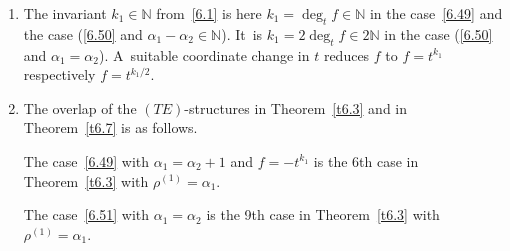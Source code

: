 \documentclass[10pt,a4paper]{amsart}
\numberwithin{equation}{section}
\numberwithin{figure}{section}
\newcommand{\N}{{\mathbb N}}
\begin{document}
\begin{Remarks}
\begin{enumerate}
\item[$(v)$] The invariant $k_1\in\N$ from~\eqref{6.1} is here
$k_1=\deg_t f\in\N$ in the case~\eqref{6.49}
and the case (\eqref{6.50} and $\alpha_1-\alpha_2\in\N$). It~is $k_1=2\deg_t f\in 2\N$ in the case
(\eqref{6.50} and $\alpha_1=\alpha_2$).
A~suitable coordinate change in $t$
reduces $f$ to $f=t^{k_1}$ respectively $f=t^{k_1/2}$.

\item[$(vi)$] The overlap of the $(TE)$-structures in Theorem~\ref{t6.3}
and in Theorem~\ref{t6.7} is as follows.

The case~\eqref{6.49} with $\alpha_1=\alpha_2+1$
and $f=-t^{k_1}$
is the 6th case in Theorem~\ref{t6.3}
with $\rho^{(1)}=\alpha_1$.

The case~\eqref{6.51} with $\alpha_1=\alpha_2$
is the 9th case in Theorem~\ref{t6.3}
with $\rho^{(1)}=\alpha_1$.
\end{enumerate}
\end{Remarks}
\end{document}
